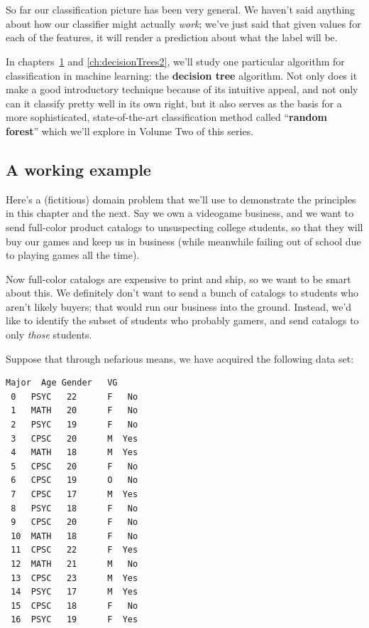 
\chapter[Decision trees (1 of 2)]{\huge\selectfont{Decision
trees for classification (1 of 2)}}
\label{ch:decisionTrees1}

So far our classification picture has been very general. We haven't said
anything about how our classifier might actually \textit{work}; we've just said
that given values for each of the features, it will render a prediction about
what the label will be.


In chapters~\ref{ch:decisionTrees1} and \ref{ch:decisionTrees2}, we'll study
one particular algorithm for classification in machine learning: the
\textbf{decision tree} algorithm. Not only does it make a good introductory
technique because of its intuitive appeal, and not only can it classify pretty
well in its own right, but it also serves as the basis for a more
sophisticated, state-of-the-art classification method called ``\textbf{random
forest}'' which we'll explore in Volume Two of this series.

\section{A working example}

 

Here's a (fictitious) domain problem that
we'll use to demonstrate the principles in this chapter and the next. Say we
own a videogame business, and we want to send full-color product catalogs to
unsuspecting college students, so that they will buy our games and keep us in
business (while meanwhile failing out of school due to playing games all the
time).

Now full-color catalogs are expensive to print and ship, so we want to be smart
about this. We definitely don't want to send a bunch of catalogs to students
who aren't likely buyers; that would run our business into the ground. Instead,
we'd like to identify the subset of students who probably gamers, and send
catalogs to only \textit{those} students.

Suppose that through nefarious means, we have acquired the following data set:

\begin{Verbatim}[fontsize=\small,samepage=true,frame=single,framesep=3mm,xleftmargin=2.8cm,xrightmargin=2.7cm]
    Major  Age Gender   VG
 0   PSYC   22      F   No
 1   MATH   20      F   No
 2   PSYC   19      F   No
 3   CPSC   20      M  Yes
 4   MATH   18      M  Yes
 5   CPSC   20      F   No
 6   CPSC   19      O   No
 7   CPSC   17      M  Yes
 8   PSYC   18      F   No
 9   CPSC   20      F   No
 10  MATH   18      F   No
 11  CPSC   22      F  Yes
 12  MATH   21      M   No
 13  CPSC   23      M  Yes
 14  PSYC   17      M  Yes
 15  CPSC   18      F   No
 16  PSYC   19      F  Yes
\end{Verbatim}

